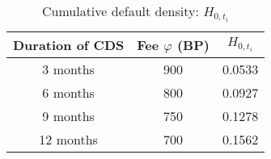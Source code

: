 \begin{table}[ht]
\centering
\begin{tabular}{@{}ccc@{}}
\toprule
Duration of CDS & Fee $\varphi$ (BP) & $H_{0, t_i}$      \\ \midrule
3 months        & 900     & 0.0533 \\
6 months        & 800     & 0.0927 \\
9 months        & 750     & 0.1278 \\
12 months       & 700     & 0.1562 \\ \bottomrule
\end{tabular}
\caption{Cumulative default density: $H_{0, t_i}$}
\label{tab:prob1}
\end{table}
